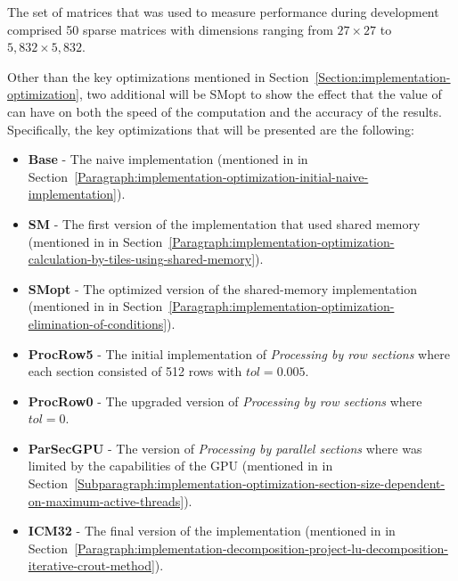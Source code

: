 The set of matrices that was used to measure performance during development comprised 50 sparse matrices with dimensions ranging from $ 27\times 27 $ to $ 5,832\times 5,832 $.
\par Other than the key optimizations mentioned in Section~\ref{Section:implementation-optimization}, two additional  will be SMopt to show the effect that the value of  can have on both the speed of the computation and the accuracy of the results. Specifically, the key optimizations that will be presented are the following:

\begin{itemize}
	\item \textbf{Base} - The naive implementation (mentioned in \textit{} in Section~\ref{Paragraph:implementation-optimization-initial-naive-implementation}).
	\item \textbf{SM} - The first version of the implementation that used shared memory (mentioned in \textit{} in Section~\ref{Paragraph:implementation-optimization-calculation-by-tiles-using-shared-memory}).
	\item \textbf{SMopt} - The optimized version of the shared-memory implementation (mentioned in \textit{} in Section~\ref{Paragraph:implementation-optimization-elimination-of-conditions}).
	\item \textbf{ProcRow5} - The initial implementation of \textit{Processing by row sections} where each section consisted of 512 rows with $ tol = 0.005 $.
	\item \textbf{ProcRow0} - The upgraded version of \textit{Processing by row sections} where $ tol = 0 $.
	\item \textbf{ParSecGPU} - The version of \textit{Processing by parallel sections} where  was limited by the capabilities of the GPU (mentioned in \textit{} in Section~\ref{Subparagraph:implementation-optimization-section-size-dependent-on-maximum-active-threads}).
	\item \textbf{ICM32} - The final version of the implementation (mentioned in \textit{} in Section~\ref{Paragraph:implementation-decomposition-project-lu-decomposition-iterative-crout-method}).
\end{itemize}

